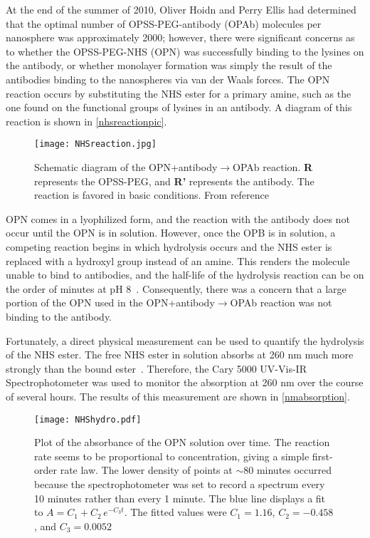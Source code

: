 At the end of the summer of 2010, Oliver Hoidn and Perry Ellis had determined that the optimal number of OPSS-PEG-antibody (OPAb) molecules per nanosphere was approximately 2000; however, there were significant concerns as to whether the OPSS-PEG-NHS (OPN) was successfully binding to the lysines on the antibody, or whether monolayer formation was simply the result of the antibodies binding to the nanospheres via van der Waals forces. The OPN reaction occurs by substituting the NHS ester for a primary amine, such as the one found on the functional groups of lysines in an antibody. A diagram of this reaction is shown in \autoref{nhsreactionpic}.

\begin{figure}[htbp]
\centering
\texttt{[image: NHSreaction.jpg]}
\caption{Schematic diagram of the OPN+antibody$\to$OPAb reaction. \textbf{R} represents the OPSS-PEG, and \textbf{R'} represents the antibody. The reaction is favored in basic conditions. From reference~\citep{nhsreaction}}
\label{nhsreactionpic}
\end{figure}



OPN comes in a lyophilized form, and the reaction with the antibody does not occur until the OPN is in solution. However, once the OPB is in solution, a competing reaction begins in which hydrolysis occurs and the NHS ester is replaced with a hydroxyl group instead of an amine. This renders the molecule unable to bind to antibodies, and the half-life of the hydrolysis reaction can be on the order of minutes at pH 8~\citep{nhshalflife}. Consequently, there was a concern that a large portion of the OPN used in the OPN+antibody$\to$OPAb reaction was not binding to the antibody.

Fortunately, a direct physical measurement can be used to quantify the hydrolysis of the NHS ester. The free NHS ester in solution absorbs at 260 nm much more strongly than the bound ester~\citep{Miron_Wilchek_1982}. Therefore, the Cary 5000 UV-Vis-IR Spectrophotometer was used to monitor the absorption at 260 nm over the course of several hours. The results of this measurement are shown in \autoref{nmabsorption}.

\begin{figure}[htbp]
\centering
\texttt{[image: NHShydro.pdf]}
\caption{Plot of the absorbance of the OPN solution over time. The reaction rate seems to be proportional to concentration, giving a simple first-order rate law. The lower density of points at \ensuremath{\sim}80 minutes occurred because the spectrophotometer was set to record a spectrum every 10 minutes rather than every 1 minute. The blue line displays a fit to $A = C_1 + C_2\, e^{-C_3 t}$. The fitted values were $C_1=1.16$, $C_2=-0.458$, and $C_3=0.0052$}
\label{nmabsorption}
\end{figure}



